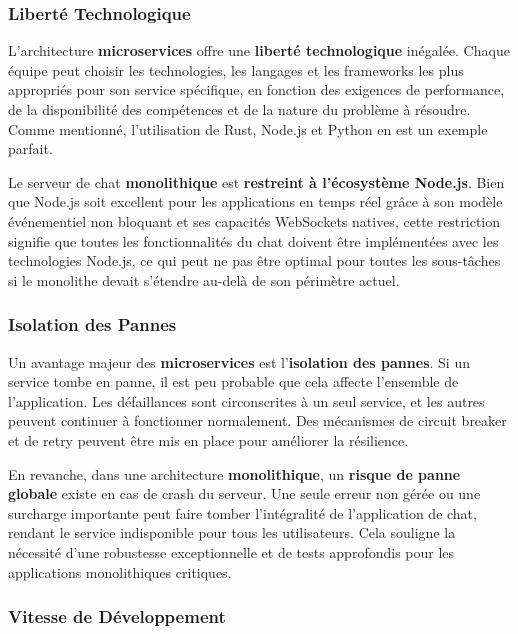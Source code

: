 \documentclass[12pt]{rapportPfe}
\begin{document}
\subsubsection{Liberté Technologique}

L'architecture \textbf{microservices} offre une \textbf{liberté technologique} inégalée. Chaque équipe peut choisir les technologies, les langages et les frameworks les plus appropriés pour son service spécifique, en fonction des exigences de performance, de la disponibilité des compétences et de la nature du problème à résoudre. Comme mentionné, l'utilisation de Rust, Node.js et Python en est un exemple parfait.

Le serveur de chat \textbf{monolithique} est \textbf{restreint à l'écosystème Node.js}. Bien que Node.js soit excellent pour les applications en temps réel grâce à son modèle événementiel non bloquant et ses capacités WebSockets natives, cette restriction signifie que toutes les fonctionnalités du chat doivent être implémentées avec les technologies Node.js, ce qui peut ne pas être optimal pour toutes les sous-tâches si le monolithe devait s'étendre au-delà de son périmètre actuel.

\subsubsection{Isolation des Pannes}

Un avantage majeur des \textbf{microservices} est l'\textbf{isolation des pannes}. Si un service tombe en panne, il est peu probable que cela affecte l'ensemble de l'application. Les défaillances sont circonscrites à un seul service, et les autres peuvent continuer à fonctionner normalement. Des mécanismes de circuit breaker et de retry peuvent être mis en place pour améliorer la résilience.

En revanche, dans une architecture \textbf{monolithique}, un \textbf{risque de panne globale} existe en cas de crash du serveur. Une seule erreur non gérée ou une surcharge importante peut faire tomber l'intégralité de l'application de chat, rendant le service indisponible pour tous les utilisateurs. Cela souligne la nécessité d'une robustesse exceptionnelle et de tests approfondis pour les applications monolithiques critiques.

\subsubsection{Vitesse de Développement}
\end{document}
